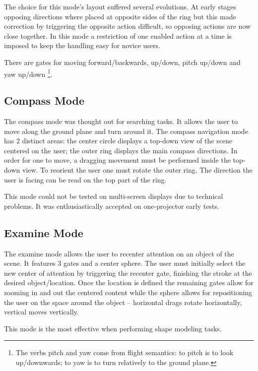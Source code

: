 The choice for this mode's layout suffered several evolutions.
At early stages opposing directions where placed at opposite sides of the ring but this
made correction by triggering the opposite action difficult, so opposing actions are now close together.
In this mode a restriction of one enabled action at a time is imposed to keep the handling easy for novice users.

There are gates for moving forward/backwards, up/down, pitch up/down and yaw up/down
\footnote{The verbs pitch and yaw come from flight semantics: to pitch is to look up/downwards; to yaw is to turn relatively to the ground plane.}.



\subsection{Compass Mode}

The compass mode was thought out for searching tasks. It allows the user to move along the ground plane and turn around it.
The compass navigation mode has 2 distinct areas:
the center circle displays a top-down view of the scene centered on the user;
the outer ring displays the main compass directions.
In order for one to move, a dragging movement must be performed inside the top-down view.
To reorient the user one must rotate the outer ring. The direction the user is facing can be read on the top part of the ring.

This mode could not be tested on multi-screen displays due to technical problems.
It was enthusiastically accepted on one-projector early tests.


\subsection{Examine Mode}

The examine mode allows the user to recenter attention on an object of the scene.
It features 3 gates and a center sphere.
The user must initially select the new center of attention by triggering the recenter gate,
finishing the stroke at the desired object/location.
Once the location is defined the remaining gates allow for zooming in and out the centered content
while the sphere allows for repositioning the user on the space around the object -- 
horizontal drags rotate horizontally, vertical moves vertically.

This mode is the most effective when performing shape modeling tasks.


